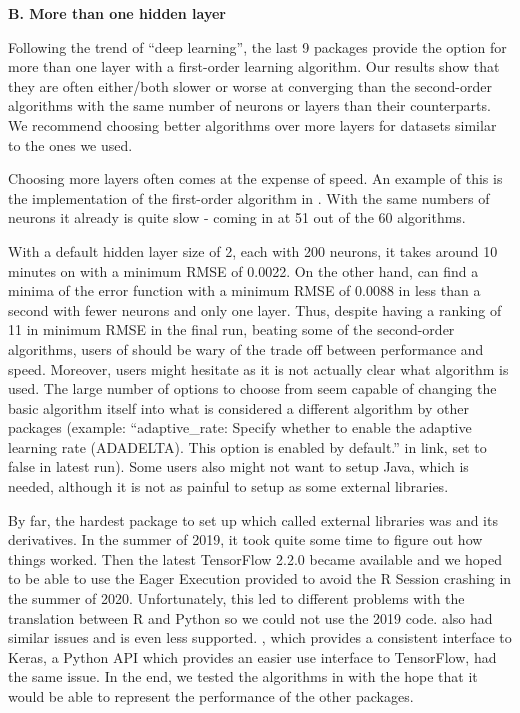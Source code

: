 \textbf{B. More than one hidden layer}

Following the trend of ``deep learning'', the last 9 packages provide
the option for more than one layer with a first-order learning
algorithm. Our results show that they are often either/both slower or
worse at converging than the second-order algorithms with the same
number of neurons or layers than their counterparts. We recommend
choosing better algorithms over more layers for datasets similar to the
ones we used.

Choosing more layers often comes at the expense of speed. An example of
this is the implementation of the first-order algorithm in 
\citep{R-h2o}. With the same numbers of neurons it already is quite slow
- coming in at 51 out of the 60 algorithms.

With a default hidden layer size of 2, each with 200 neurons, it takes
around 10 minutes on  with a minimum RMSE of 0.0022. On
the other hand,  can find a minima of the error function
with a minimum RMSE of 0.0088 in less than a second with fewer neurons
and only one layer. Thus, despite having a ranking of 11 in minimum RMSE
in the final run, beating some of the second-order algorithms, users of
 should be wary of the trade off between performance and
speed. Moreover, users might hesitate as it is not actually clear what
algorithm is used. The large number of options to choose from seem
capable of changing the basic algorithm itself into what is considered a
different algorithm by other packages (example: ``adaptive\_rate:
Specify whether to enable the adaptive learning rate (ADADELTA). This
option is enabled by default.'' in link, set to false in latest run).
Some users also might not want to setup Java, which is needed, although
it is not as painful to setup as some external libraries.

By far, the hardest package to set up which called external libraries
was  \citep{R-tensorflow} and its derivatives. In
the summer of 2019, it took quite some time to figure out how things
worked. Then the latest \textsf{TensorFlow} 2.2.0 became available and
we hoped to be able to use the Eager Execution provided to avoid the
\textsf{R} Session crashing in the summer of 2020. Unfortunately, this
led to different problems with the translation between \textsf{R} and
\textsf{Python} so we could not use the 2019 code.
 \citep{R-tfestimators} also had similar issues
and is even less supported.  \citep{R-kerasR}, which
provides a consistent interface to Keras, a \textsf{Python} API which
provides an easier use interface to TensorFlow, had the same issue. In
the end, we tested the algorithms in  \citep{R-keras}
with the hope that it would be able to represent the performance of the
other packages.

